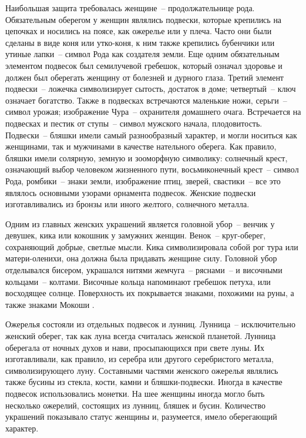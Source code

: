 \documentclass[pscyr,chapters]{hedwork}
\begin{document}
  Наибольшая защита требовалась женщине~-- продолжательнице рода. Обязательным
  оберегом у женщин являлись подвески, которые крепились на цепочках и носились
  на поясе, как ожерелье или у плеча. Часто они были сделаны в виде коня или
  утко-коня, к ним также крепились бубенчики или утиные лапки~-- символ Рода как
  создателя земли. Еще одним обязательным элементом подвесок был семилучевой
  гребешок, который означал здоровье и должен был оберегать женщину от болезней
  и дурного глаза. Третий элемент подвески~-- ложечка символизирует сытость,
  достаток в доме; четвертый~-- ключ означает богатство. Также в подвесках
  встречаются маленькие ножи, серьги~-- символ урожая; изображение Чура~--
  охранителя домашнего очага. Встречается на подвесках и пестик от ступы~--
  символ мужского начала, плодовитость. Подвески~-- бляшки имели самый
  разнообразный характер, и могли носиться как женщинами, так и мужчинами в
  качестве нательного оберега. Как правило, бляшки имели солярную, земную и
  зооморфную символику: солнечный крест, означающий выбор человеком жизненного
  пути, восьмиконечный крест~-- символ Рода, ромбики~-- знаки земли, изображение
  птиц, зверей, свастики~-- все это являлось основными узорами орнамента
  подвесок. Женские подвески изготавливались из бронзы или иного желтого,
  солнечного металла.

  Одним из главных женских украшений является головной убор~-- венчик у девушек,
  кика или кокошник у замужних женщин. Венок~-- круг-оберег, сохраняющий добрые,
  светлые мысли. Кика символизировала собой рог тура или матери-оленихи, она
  должна была придавать женщине силу. Головной убор отделывался бисером,
  украшался нитями жемчуга~-- ряснами~-- и височными кольцами~-- колтами.
  Височные кольца напоминают гребешок петуха, или восходящее солнце. Поверхность
  их покрывается знаками, похожими на руны, а также знаками Мокоши \cite{6}.

  Ожерелья состояли из отдельных подвесок и лунниц. Лунница~-- исключительно
  женский оберег, так как луна всегда считалась женской планетой. Лунница
  оберегала от ночных духов и нави, просыпающихся при свете луны. Их
  изготавливали, как правило, из серебра или другого серебристого металла,
  символизирующего луну. Составными частями женского ожерелья являлись также
  бусины из стекла, кости, камни и бляшки-подвески. Иногда в качестве подвесок
  использовались монетки. На шее женщины иногда могло быть несколько ожерелий,
  состоящих из лунниц, бляшек и бусин. Количество украшений показывало статус
  женщины и, разумеется, имело оберегающий характер.
\end{document}
